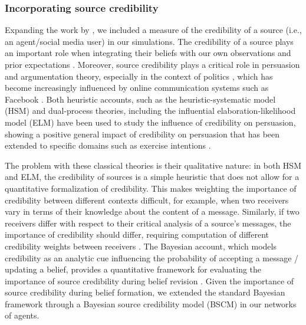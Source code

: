 \documentclass[doc,floatsintext]{apa6}
\begin{document}
\subsubsection{Incorporating source credibility}
Expanding the work by \citep{madsen2017growing, madsen2018large}, we included a measure of the credibility of a source (i.e., an agent/social media user) in our simulations. The credibility of a source plays an important role when integrating their beliefs with our own observations and prior expectations \citep{cuddy2011dynamics, fiske2007universal}. Moreover, source credibility plays a critical role in persuasion and argumentation theory, especially in the context of politics \citep{housholder2014facebook, robinson1999measures, cialdini2007influence}, which has become increasingly influenced by online communication systems such as Facebook \citep{bail2016combining}. Both heuristic accounts, such as the heuristic-systematic model (HSM) \citep{chaiken1999heuristic} and dual-process theories, including the influential elaboration-likelihood model (ELM) \citep{petty1986elaboration} have been used to study the influence of credibility on persuasion, showing a positive general impact of credibility on persuasion \citep{chaiken1994heuristic} that has been extended to specific domains such as exercise intentions \citep{jones2003effects}. 

The problem with these classical theories is their qualitative nature: in both HSM and ELM, the credibility of sources is a simple heuristic that does not allow for a quantitative formalization of credibility. This makes weighting the importance of credibility between different contexts difficult, for example, when two receivers vary in terms of their knowledge about the content of a message. Similarly, if two receivers differ with respect to their critical analysis of a source's messages, the importance of credibility should differ, requiring computation of different credibility weights between receivers \citep{madsen2018method}. The Bayesian account, which models credibility as an analytic cue influencing the probability of accepting a message / updating a belief, provides a quantitative framework for evaluating the importance of source credibility during belief revision \citep{harris2009bayesian, oaksford2007bayesian}. Given the importance of source credibility during belief formation, we extended the standard Bayesian framework through a Bayesian source credibility model (BSCM) in our networks of agents. 

\end{document}
